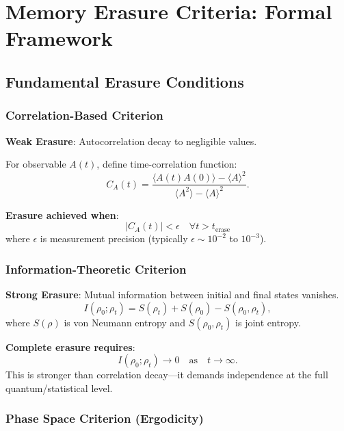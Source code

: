 \documentclass[11pt]{article}
\theoremstyle{defstyle}
\theoremstyle{mapstyle}
\begin{document}
\section{Memory Erasure Criteria: Formal Framework}
\label{app:memory_erasure}

\subsection{Fundamental Erasure Conditions}

\subsubsection{Correlation-Based Criterion}

\textbf{Weak Erasure}: Autocorrelation decay to negligible values.

For observable $A(t)$, define time-correlation function:
\begin{equation}
C_A(t) = \frac{\langle A(t) A(0) \rangle - \langle A \rangle^2}{\langle A^2 \rangle - \langle A \rangle^2}.
\end{equation}

\textbf{Erasure achieved when}:
\begin{equation}
\boxed{|C_A(t)| < \epsilon \quad \forall t > t_{\text{erase}}}
\end{equation}
where $\epsilon$ is measurement precision (typically $\epsilon \sim 10^{-2}$ to $10^{-3}$).

\subsubsection{Information-Theoretic Criterion}

\textbf{Strong Erasure}: Mutual information between initial and final states vanishes.
\begin{equation}
I(\rho_0; \rho_t) = S(\rho_t) + S(\rho_0) - S(\rho_0, \rho_t),
\end{equation}
where $S(\rho)$ is von Neumann entropy and $S(\rho_0, \rho_t)$ is joint entropy.

\textbf{Complete erasure requires}:
\begin{equation}
\boxed{I(\rho_0; \rho_t) \to 0 \quad \text{as} \quad t \to \infty.}
\end{equation}
This is stronger than correlation decay---it demands independence at the full quantum/statistical level.

\subsubsection{Phase Space Criterion (Ergodicity)}
\end{document}
